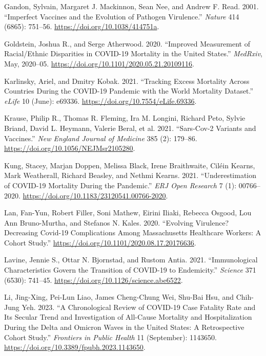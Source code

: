 \documentclass[
  letterpaper,
  DIV=11,
  numbers=noendperiod]{scrartcl}
\newlength{\cslhangindent}
\newenvironment{CSLReferences}[2] %
 {\begin{list}{}{%
  \setlength{\itemindent}{0pt}
  \setlength{\leftmargin}{0pt}
  \setlength{\parsep}{0pt}
  \ifodd #1
   \setlength{\leftmargin}{\cslhangindent}
   \setlength{\itemindent}{-1\cslhangindent}
  \fi
  \setlength{\itemsep}{#2\baselineskip}}}
 {\end{list}}
\begin{document}
\begin{CSLReferences}{1}{0}
Gandon, Sylvain, Margaret J. Mackinnon, Sean Nee, and Andrew F. Read.
2001. {``Imperfect Vaccines and the Evolution of Pathogen Virulence.''}
\emph{Nature} 414 (6865): 751--56.
\url{https://doi.org/10.1038/414751a}.

Goldstein, Joshua R., and Serge Atherwood. 2020. {``Improved Measurement
of Racial/Ethnic Disparities in {COVID}-19 Mortality in the {United}
{States}.''} \emph{MedRxiv}, May, 2020--05.
\url{https://doi.org/10.1101/2020.05.21.20109116}.

Karlinsky, Ariel, and Dmitry Kobak. 2021. {``Tracking Excess Mortality
Across Countries During the {COVID}-19 Pandemic with the {World}
{Mortality} {Dataset}.''} \emph{eLife} 10 (June): e69336.
\url{https://doi.org/10.7554/eLife.69336}.

Krause, Philip R., Thomas R. Fleming, Ira M. Longini, Richard Peto,
Sylvie Briand, David L. Heymann, Valerie Beral, et al. 2021.
{``Sars-Cov-2 Variants and Vaccines.''} \emph{New England Journal of
Medicine} 385 (2): 179--86. \url{https://doi.org/10.1056/NEJMsr2105280}.

Kung, Stacey, Marjan Doppen, Melissa Black, Irene Braithwaite, Ciléin
Kearns, Mark Weatherall, Richard Beasley, and Nethmi Kearns. 2021.
{``Underestimation of {COVID}-19 Mortality During the Pandemic.''}
\emph{ERJ Open Research} 7 (1): 00766--2020.
\url{https://doi.org/10.1183/23120541.00766-2020}.

Lan, Fan-Yun, Robert Filler, Soni Mathew, Eirini Iliaki, Rebecca Osgood,
Lou Ann Bruno-Murtha, and Stefanos N. Kales. 2020. {``Evolving
Virulence? {Decreasing} Covid-19 Complications Among Massachusetts
Healthcare Workers: A Cohort Study.''}
\url{https://doi.org/10.1101/2020.08.17.20176636}.

Lavine, Jennie S., Ottar N. Bjornstad, and Rustom Antia. 2021.
{``Immunological Characteristics Govern the Transition of {COVID}-19 to
Endemicity.''} \emph{Science} 371 (6530): 741--45.
\url{https://doi.org/10.1126/science.abe6522}.

Li, Jing-Xing, Pei-Lun Liao, James Cheng-Chung Wei, Shu-Bai Hsu, and
Chih-Jung Yeh. 2023. {``A Chronological Review of {COVID}-19 Case
Fatality Rate and Its Secular Trend and Investigation of All-Cause
Mortality and Hospitalization During the {Delta} and {Omicron} Waves in
the {United} {States}: A Retrospective Cohort Study.''} \emph{Frontiers
in Public Health} 11 (September): 1143650.
\url{https://doi.org/10.3389/fpubh.2023.1143650}.


\end{CSLReferences}
\end{document}
